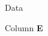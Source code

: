 \begin{appendix}
\begin{chapter}{Data}
\begin{section}{Column \textbf{E}}
    \end{section}
    
  \end{chapter}
  
\end{appendix}
 